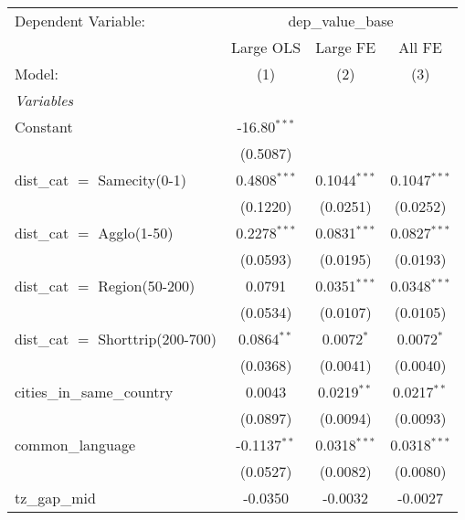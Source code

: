 \begingroup
\centering
\begin{tabular}{lccc}
   \tabularnewline \midrule \midrule
   Dependent Variable: & \multicolumn{3}{c}{dep\_value\_base}\\
                                                  & Large OLS      & Large FE       & All FE \\   
   Model:                                         & (1)            & (2)            & (3)\\  
   \midrule
   \emph{Variables}\\
   Constant                                       & -16.80$^{***}$ &                &   \\   
                                                  & (0.5087)       &                &   \\   
   dist\_cat $=$ Samecity(0-1)                    & 0.4808$^{***}$ & 0.1044$^{***}$ & 0.1047$^{***}$\\   
                                                  & (0.1220)       & (0.0251)       & (0.0252)\\   
   dist\_cat $=$ Agglo(1-50)                      & 0.2278$^{***}$ & 0.0831$^{***}$ & 0.0827$^{***}$\\   
                                                  & (0.0593)       & (0.0195)       & (0.0193)\\   
   dist\_cat $=$ Region(50-200)                   & 0.0791         & 0.0351$^{***}$ & 0.0348$^{***}$\\   
                                                  & (0.0534)       & (0.0107)       & (0.0105)\\   
   dist\_cat $=$ Shorttrip(200-700)               & 0.0864$^{**}$  & 0.0072$^{*}$   & 0.0072$^{*}$\\   
                                                  & (0.0368)       & (0.0041)       & (0.0040)\\   
   cities\_in\_same\_country                      & 0.0043         & 0.0219$^{**}$  & 0.0217$^{**}$\\   
                                                  & (0.0897)       & (0.0094)       & (0.0093)\\   
   common\_language                               & -0.1137$^{**}$ & 0.0318$^{***}$ & 0.0318$^{***}$\\   
                                                  & (0.0527)       & (0.0082)       & (0.0080)\\   
   tz\_gap\_mid                                   & -0.0350        & -0.0032        & -0.0027\\   

\end{tabular}
